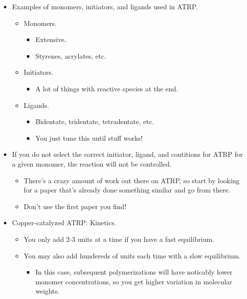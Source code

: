 \documentclass[../notes.tex]{subfiles}
\begin{document}
\begin{itemize}
\begin{itemize}
    \end{itemize}
    \item Examples of monomers, initiators, and ligands used in ATRP.
    \begin{itemize}
        \item Monomers.
        \begin{itemize}
            \item Extensive.
            \item Styrenes, acrylates, etc.
        \end{itemize}
        \item Initiators.
        \begin{itemize}
            \item A lot of things with reactive species at the end.
        \end{itemize}
        \item Ligands.
        \begin{itemize}
            \item Bidentate, tridentate, tetradentate, etc.
            \item You just tune this until stuff works!
        \end{itemize}
    \end{itemize}
    \item If you do not select the correct initiator, ligand, and contitions for ATRP for a given monomer, the reaction will not be controlled.
    \begin{itemize}
        \item There's a crazy amount of work out there on ATRP, so start by looking for a paper that's already done something similar and go from there.
        \item Don't use the first paper you find!
    \end{itemize}
    \item Copper-catalyzed ATRP: Kinetics.
    \begin{itemize}
        \item You only add 2-3 units at a time if you have a fast equilibrium.
        \item You may also add hundereds of units each time with a slow equilibrium.
        \begin{itemize}
            \item In this case, subsequent polymerizations will have noticably lower monomer concentrations, so you get higher variation in molecular weights.
        \end{itemize}

\end{itemize}
\end{itemize}
\end{document}
